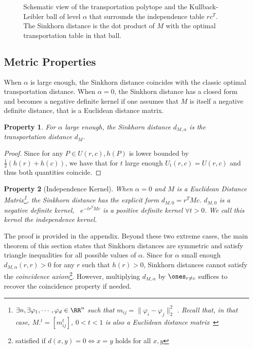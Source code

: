 \documentclass{amsart} %
\newtheorem{property}{Property}
\providecommand{\norm}[1]{\lVert#1\rVert}
\begin{document}
\begin{figure}\centering
{\LARGE{}}
\caption{Schematic view of the transportation polytope and the Kullback-Leibler ball of level $\alpha$ that surrounds the independence table $rc^T$. The Sinkhorn distance is the dot product of $M$ with the optimal transportation table in that ball.}\label{fig:jolidessin}
\end{figure}

\subsection{Metric Properties}
When $\alpha$ is large enough, the Sinkhorn distance coincides with the classic optimal transportation distance. When $\alpha=0$, the Sinkhorn distance has a closed form and becomes a negative definite kernel if one assumes that $M$ is itself a negative definite distance, that is a Euclidean distance matrix.


\begin{property}\label{prop:nsd} For $\alpha$ large enough, the Sinkhorn distance $d_{M,\alpha}$ is the transportation distance $d_{M}$.\end{property}
\begin{proof}Since for any $P\in U(r,c), h(P)$ is lower bounded by $\tfrac{1}{2}(h(r)+h(c))$, we have that for $t$ large enough $U_{t}(r,c)= U(r,c)$ and thus both quantities coincide.\end{proof}



\begin{property}[Independence Kernel] When $\alpha=0$ and $M$ is a Euclidean Distance Matrix\footnote{$\exists n, \exists \varphi_1,\cdots,\varphi_d\in\RR^n$ such that $m_{ij}=\norm{\varphi_i - \varphi_j}_2^2$ \citep[\S5]{dattorro2005convex}. Recall that, in that case, $M.^t=[m_{ij}^t]$, $0<t<1$ is also a Euclidean distance matrix~\cite[p.78,\S3.2.10]{berg84harmonic} }, the Sinkhorn distance has the explicit form $d_{M,0}=r^T M c$. $d_{M,0}$ is a negative definite kernel, \ie\, $e^{-t r^TMc}$ is a positive definite kernel $\forall t>0$. We call this kernel the independence kernel.\end{property}

The proof is provided in the appendix. Beyond these two extreme cases, the main theorem of this section states that Sinkhorn distances are symmetric and satisfy triangle inequalities for all possible values of $\alpha$. Since for $\alpha$ small enough $d_{M,\alpha}(r,r)>0$ for any $r$ such that $h(r)>0$, Sinkhorn distances cannot satisfy the \emph{coincidence axiom}\footnote{satisfied if $d(x,y)=0\Leftrightarrow x=y$ holds for all $x,y$}. However, multiplying $d_{M,\alpha}$ by $\ones_{r\ne c}$ suffices to recover the coincidence property if needed.
\end{document}
